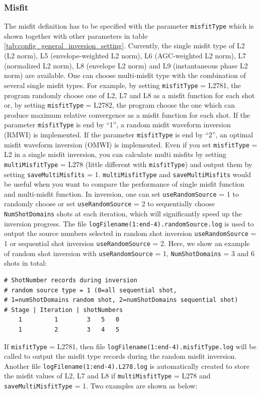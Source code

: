 \documentclass[pdftex,a4paper,parskip,listof=totoc,bibliography=totoc,onehalfspacing,12pt]{scrreprt}
\begin{document}
\subsubsection{Misfit}
The misfit definition has to be specified with the parameter \verb+misfitType+ which is shown together with other parameters in table \ref{tab:config_general_inversion_setting}. Currently, the single misfit type of L2 (L2 norm), L5 (envelope-weighted L2 norm), L6 (AGC-weighted L2 norm), L7 (normalized L2 norm), L8 (envelope L2 norm) and L9 (instantaneous phase L2 norm) are available. One can choose multi-misfit type with the combination of several single misfit types. For example, by setting \verb+misfitType+ = L2781, the program randomly choose one of L2, L7 and L8 as a misfit function for each shot or, by setting \verb+misfitType+ = L2782, the program choose the one which can produce maximum relative convergence as a misfit function for each shot. If the parameter \verb+misfitType+ is end by ``1'', a random misfit waveform inversion (RMWI) is implemented. If the parameter \verb+misfitType+ is end by ``2'', an optimal misfit waveform inversion (OMWI) is implemented. Even if you set \verb+misfitType+ = L2 in a single misfit inversion, you can calculate multi misfits by setting \verb+multiMisfitType+ = L278 (little different with \verb+misfitType+) and output them by setting \verb+saveMultiMisfits+ = 1. \verb+multiMisfitType+ and \verb+saveMultiMisfits+ would be useful when you want to compare the performance of single misfit function and multi-misfit function. In inversion, one can set \verb+useRandomSource+ = 1 to randomly choose or set \verb+useRandomSource+ = 2 to sequentially choose \verb+NumShotDomains+ shots at each iteration, which will significantly speed up the inversion progress. The file \verb+logFilename(1:end-4).randomSource.log+ is used to output the source numbers selected in random shot inversion \verb+useRandomSource+ = 1 or sequential shot inversion \verb+useRandomSource+ = 2. Here, we show an example of random shot inversion with \verb+useRandomSource+ = 1, \verb+NumShotDomains+ = 3 and 6 shots in total:
\begin{verbatim}
# ShotNumber records during inversion
# random source type = 1 (0=all sequential shot,
# 1=numShotDomains random shot, 2=numShotDomains sequential shot)
# Stage | Iteration | shotNumbers
    1         1        3   5   0
    1         2        3   4   5
\end{verbatim}
If \verb+misfitType+ = L2781, then file \verb+logFilename(1:end-4).misfitType.log+ will be called to output the misfit type records during the random misfit inversion. Another file \verb+logFilename(1:end-4).L278.log+ is automatically created to store the misfit values of L2, L7 and L8 if \verb+multiMisfitType+ = L278 and \verb+saveMultiMisfitType+ = 1. Two examples are shown as below:
\end{document}
